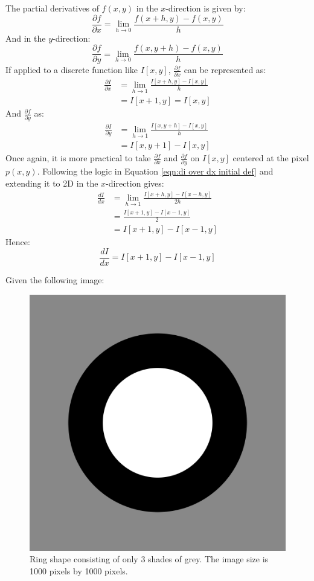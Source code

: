 \documentclass{article}
\begin{document}
The partial derivatives of $f(x,y)$ in the $x$-direction is given by:
\begin{equation}
    \frac{\partial f}{\partial x} = \lim_{h \to 0}{\frac{f(x+h, y) - f(x, y)}{h}}
\end{equation}
And in the $y$-direction:
\begin{equation}
    \frac{\partial f}{\partial y} = \lim_{h \to 0}{\frac{f(x, y+h) - f(x, y)}{h}}
\end{equation}
If applied to a discrete function like $I[x,y]$, $\frac{\partial f}{\partial x}$ can be represented as:
\begin{align}
    \frac{\partial I}{\partial x} &= \lim_{h \to 1}{\frac{I[x+h, y] - I[x, y]}{h}} \nonumber \\
    &= I[x+1, y] = I[x,y]
\end{align}
And $\frac{\partial f}{\partial y}$ as:
\begin{align}
    \frac{\partial I}{\partial y} &= \lim_{h \to 1}{\frac{I[x, y+h] - I[x, y]}{h}} \nonumber \\
    &= I[x, y+1] - I[x, y]
\end{align}
Once again, it is more practical to take $\frac{\partial f}{\partial x}$ and $\frac{\partial f}{\partial y}$ on $I[x, y]$ centered at the pixel $p(x, y)$. Following the logic in Equation \eqref{eqn:di over dx initial def} and extending it to 2D in the $x$-direction gives:
\begin{align}
    \frac{dI}{dx} &= \lim_{h \to 1}{\frac{I[x+h, y] - I[x-h, y]}{2h}} \nonumber \\
    &= \frac{I[x+1, y] - I[x-1, y]}{2} \nonumber \\
    &= I[x+1, y] - I[x-1, y]
    \label{eqn:di over dx initial def 2d}
\end{align}
Hence:
\begin{equation}
    \frac{dI}{dx} = I[x+1, y] - I[x-1, y]
\end{equation}

\newpage

Given the following image:

\begin{figure}[!hbtp]
    \centering
    \includegraphics[width=0.5\linewidth]{figures/figure06.png}
    \caption{Ring shape consisting of only 3 shades of grey. The image size is 1000 pixels by 1000 pixels.}
    \label{fig:figur 6}
\end{figure}
\end{document}
